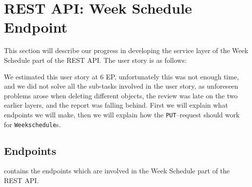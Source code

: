 \section{REST API: Week Schedule Endpoint}\label{sec:weekscheduleendpoint}
This section will describe our progress in developing the service layer of the Week Schedule part of the REST API.
The user story is as follows:
\begin{center}
\end{center}

We estimated this user story at 6 EP, unfortunately this was not enough time, and we did not solve all the sub-tasks involved in the user story, as unforeseen problems arose when deleting different objects, the review was late on the two earlier layers, and the report was falling behind.
First we will explain what endpoints we will make, then we will explain how the \texttt{PUT}--request should work for \texttt{Weekschedule}s.
\subsection{Endpoints}
 contains the endpoints which are involved in the Week Schedule part of the REST API.

